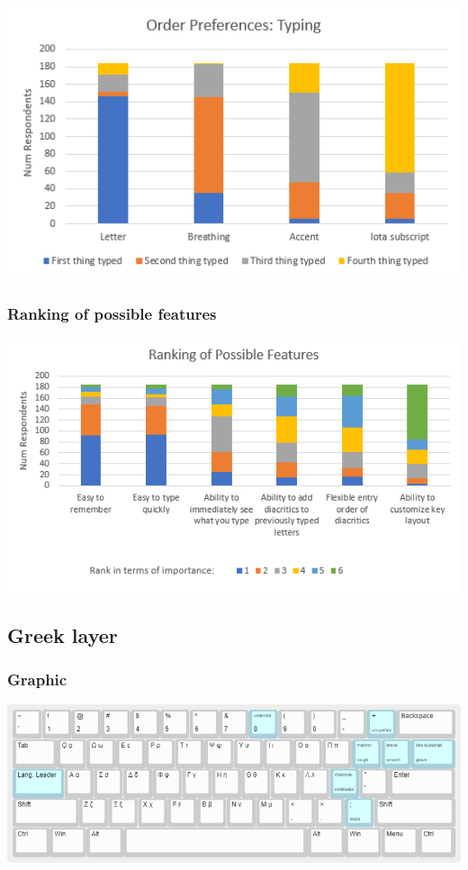 \documentclass[11pt]{article}
\begin{document}
\begin{center}
\includegraphics[width=.9\linewidth]{./images/diacritic-entry-order-typing.PNG}
\end{center}

\subsubsection{Ranking of possible features}
\label{sec:org90e5791}

\begin{center}
\includegraphics[width=.9\linewidth]{./images/ranking-of-possible-features.PNG}
\end{center}

\subsection{Greek layer}
\label{sec:orgaef0a0b}

\subsubsection{Graphic}
\label{sec:org645bba0}

\begin{center}
\includegraphics[width=.9\linewidth]{./images/greek-layer.png}
\end{center}
\end{document}
